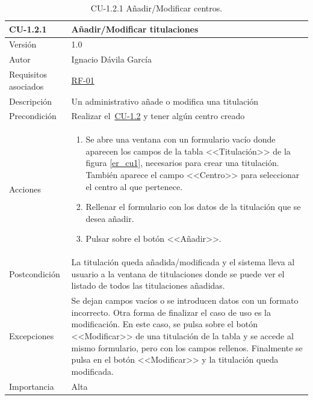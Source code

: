 \begin{table}[p]
	\centering
	\begin{tabularx}{\linewidth}{ p{} p{} }
		\toprule
		\textbf{CU-1.2.1}    & \textbf{Añadir/Modificar titulaciones}\\
		\toprule
		{\small Versión}              & 1.0    \\
		{\small Autor}                & Ignacio Dávila García \\
		{\small Requisitos asociados} & \hyperref[itm:RF1]{RF-01} \\
		{\small Descripción}          & Un administrativo añade o modifica una titulación \\
		{\small Precondición}         & Realizar el~\hyperref[table:CU-1_2]{CU-1.2} y tener algún centro creado \\
		{\small Acciones}             &
		\begin{enumerate}
			\def\labelenumi{\arabic{enumi}.}
			\tightlist
			\item Se abre una ventana con un formulario vacío donde aparecen los campos de la tabla <<Titulación>> de la figura \ref{er_cu1}, necesarios para crear una titulación. También aparece el campo <<Centro>> para seleccionar el centro al que pertenece.
			\item Rellenar el formulario con los datos de la titulación que se desea añadir.
			\item Pulsar sobre el botón <<Añadir>>.
		\end{enumerate}\\
		{\small Postcondición}        & La titulación queda añadida/modificada y el sistema lleva al usuario a la ventana de titulaciones donde se puede ver el listado de todos las titulaciones añadidas. \\
		{\small Excepciones}          & Se dejan campos vacíos o se introducen datos con un formato incorrecto. Otra forma de finalizar el caso de uso es la modificación. En este caso, se pulsa sobre el botón <<Modificar>> de una titulación de la tabla y se accede al mismo formulario, pero con los campos rellenos. Finalmente se pulsa en el botón <<Modificar>> y la titulación queda modificada. \\
		{\small Importancia}          & Alta \\
		\bottomrule
	\end{tabularx}
	\caption{CU-1.2.1 Añadir/Modificar centros.}\label{table:CU-1_2_1}
\end{table}
\FloatBarrier

